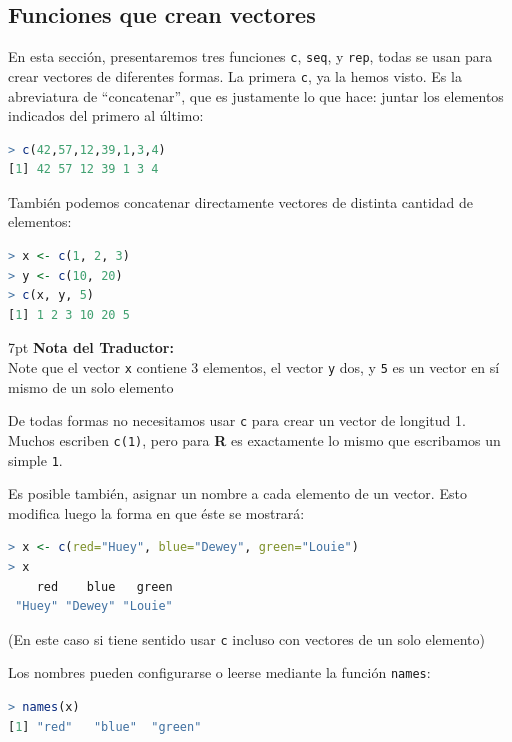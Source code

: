 \documentclass[spanish]{extbook}
\newenvironment{tradnote}{%
  \def\FrameCommand{%
    \hspace{1pt}%
    {\color{darkblue}\vrule width 2pt}%
    {\color{formalshade}\vrule width 4pt}%
    \colorbox{formalshade}%
  }%
  \vspace{12pt}
  \MakeFramed{\advance\hsize-\width\FrameRestore}%
  \noindent\hspace{-4.55pt}%
  \begin{adjustwidth}{}{7pt}%
  \vspace{1pt}%
  \textbf{Nota del Traductor:\\}%
}
{%
  \vspace{6pt}\end{adjustwidth}\endMakeFramed%
}
\numberwithin{equation}{section}
\numberwithin{figure}{section}
\begin{document}
\subsection{Funciones que crean vectores}

En esta sección, presentaremos tres funciones \texttt{c}, \texttt{seq}, y
\texttt{rep}, todas se usan para crear vectores de diferentes formas.  La
primera \texttt{c}, ya la hemos visto. Es la abreviatura de ``concatenar'', que
es justamente lo que hace: juntar los elementos indicados del primero al último:

\begin{lstlisting}[language=R]
> c(42,57,12,39,1,3,4)
[1] 42 57 12 39 1 3 4
\end{lstlisting}

También podemos concatenar directamente vectores de distinta cantidad de elementos:

\begin{lstlisting}[language=R]
> x <- c(1, 2, 3)
> y <- c(10, 20)
> c(x, y, 5)
[1] 1 2 3 10 20 5
\end{lstlisting}

\begin{tradnote} Note que el vector \texttt{x} contiene 3 elementos, el vector
\texttt{y} dos, y \texttt{5} es un vector en sí mismo de un solo elemento
\end{tradnote} \newpage

De todas formas no necesitamos usar \texttt{c} para crear un vector de longitud
1. Muchos escriben \texttt{c(1)}, pero para \textbf{R} es exactamente lo mismo
que escribamos un simple \texttt{1}.

Es posible también, asignar un nombre a cada elemento de un vector. Esto
modifica luego la forma en que éste se mostrará:

\begin{lstlisting}[language=R]
> x <- c(red="Huey", blue="Dewey", green="Louie")
> x
    red    blue   green 
 "Huey" "Dewey" "Louie"
\end{lstlisting}

(En este caso si tiene sentido usar \texttt{c} incluso con vectores de un solo
elemento)

Los nombres pueden configurarse o leerse mediante la función \texttt{names}:

\begin{lstlisting}[language=R]
> names(x)
[1] "red"   "blue"  "green"
\end{lstlisting}
\end{document}
